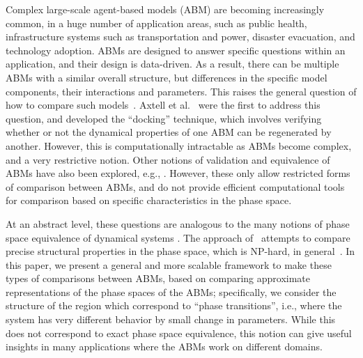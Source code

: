 Complex large-scale agent-based models (ABM) are becoming increasingly common, in a huge number of application areas,
such as public health, infrastructure systems such as transportation and power, disaster evacuation, and
technology adoption.
ABMs are designed to answer specific questions within an application, and their design is data-driven.
As a result, there can be multiple ABMs with a similar overall structure, but differences in the
specific model components, their interactions and parameters.
This raises the general question of how to compare such models~\cite{axtell96aligning,burton99validation}.
Axtell et al.~\cite{axtell96aligning} were the first to address this question, and developed the ``docking'' technique,
which involves verifying whether or not the dynamical properties of one ABM can be regenerated by another.
However, this is computationally intractable as ABMs become complex, and a very restrictive notion.
Other notions of validation and equivalence of ABMs have also been explored, e.g., \cite{Volk-Makarewicz:2017:MVA:3242181.3242289,Bharathy:2010:VAB:2433508.2433559}. However, these only allow restricted forms of comparison between ABMs, and do not provide efficient computational tools for comparison based on specific characteristics in the phase space.

At an abstract level, these questions are analogous to the many notions of phase space equivalence of dynamical systems \cite{mortveit, adiga:wsc19}. The approach of~\cite{axtell96aligning} attempts to compare precise structural properties in the phase space, which is NP-hard, in general~\cite{adiga:wsc19}.  
In this paper, we present a general and more scalable framework to make these types of comparisons between ABMs, based on comparing approximate representations of the phase spaces of the ABMs; specifically, we consider the structure of the region which correspond to ``phase transitions'', i.e., where the system has very different behavior by small change in parameters. 
While this does not correspond to exact phase space equivalence, this notion can give useful insights in many applications where the ABMs work on different domains.

